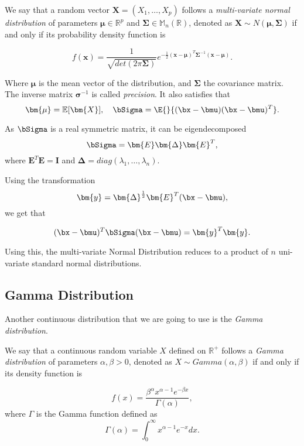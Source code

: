 \begin{definition}
We say that a random vector \(\bm{X} = (X_1,\dots,X_p)\) follows a \emph{multi-variate normal
  distribution} of parameters \(\bm{\mu} \in \mathbb{R}^p\) and \(\bm{\Sigma}
\in \mathbb{M}_n(\mathbb{R})\), denoted as \(\bm{X} \sim N(\bm{\mu},
\bm{\Sigma})\) if and only if its probability density function is

\[
  f(\bm{x}) = \frac{1}{\sqrt{det(2\pi \bm{\Sigma})}}e^{-\frac{1}{2}(\bm{x} - \bm{\mu})^T\bm{\Sigma}^{-1}(\bm{x}-\bm{\mu})} .
\]

Where \(\bm{\mu}\) is the mean vector of the distribution, and \(\bm{\Sigma}\)
the covariance matrix. The inverse matrix \(\bm{\sigma}^{-1}\) is called \emph{precision}.
It also satisfies that
\[
\bm{\mu} = \mathbb{E}[\bm{X}], \quad \bSigma = \E{}{(\bx - \bmu)(\bx - \bmu)^T}.
\]

As \(\bSigma\) is a real symmetric matrix, it can be eigendecomposed
\[
  \bSigma = \bm{E}\bm{\Delta}\bm{E}^T,
\]
where \(\bm{E}^T\bm{E} = \bm{I}\) and \(\bm{\Delta} =
diag(\lambda_1,\dots,\lambda_n)\).

Using the transformation
\[
  \bm{y} = \bm{\Delta}^{\frac{1}{2}}\bm{E}^T(\bx - \bmu),
\]
we get that

\[
  (\bx - \bmu)^T\bSigma(\bx - \bmu) = \bm{y}^T\bm{y}.
\]

Using this, the multi-variate Normal Distribution reduces to a product of \(n\)
uni-variate standard normal distributions.

\end{definition}

\subsection{Gamma Distribution}

Another continuous distribution that we are going to use is the \emph{Gamma
  distribution}.

\begin{definition}

  We say that a continuous random variable \(X\) defined on \(\mathbb{R}^{+}\)  follows a \emph{Gamma distribution} of parameters \(\alpha,
\beta > 0\), denoted as \(X \sim Gamma(\alpha, \beta)\) if and only if its
density function is

\[
  f(x) = \frac{\beta^{\alpha} x^{\alpha-1}e^{-\beta x}}{\Gamma(\alpha)},
\]
where \(\Gamma\) is the Gamma function defined as
\[
  \Gamma(\alpha) = \int_{0}^{\infty}x^{\alpha-1}e^{-x} dx.
\]
\end{definition}

